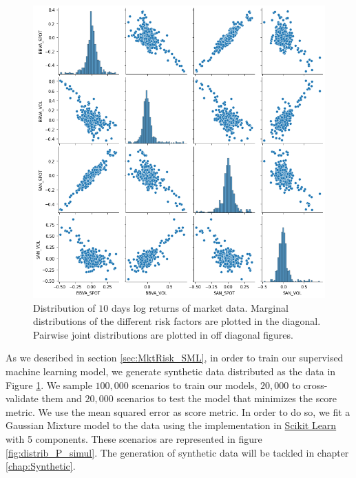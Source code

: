 \begin{figure}[H] 
\centering
\includegraphics[width=1.0\textwidth]{Figures/MarketRisk/histdata.png}
\caption{Distribution of $10$ days log returns of market data. Marginal distributions of the different risk factors are plotted in the diagonal. Pairwise joint distributions are plotted in off diagonal figures.}
\label{fig:distrib_P}
\end{figure}
As we described in section \ref{sec:MktRisk_SML}, in order to train our supervised machine learning model, we generate synthetic data distributed as the data in Figure \ref{fig:distrib_P}. We sample $100,000$ scenarios to train our models, $20,000$ to cross-validate them and $20,000$ scenarios to test the model that minimizes the score metric. We use the mean squared error as score metric. In order to do so, we  fit a Gaussian Mixture model to the data using the implementation in \href{https://scikit-learn.org/stable/modules/generated/sklearn.mixture.GaussianMixture.html}{Scikit Learn} with 5 components. These scenarios are represented in figure \ref{fig:distrib_P_simul}. The generation of synthetic data will be tackled in chapter \ref{chap:Synthetic}.


